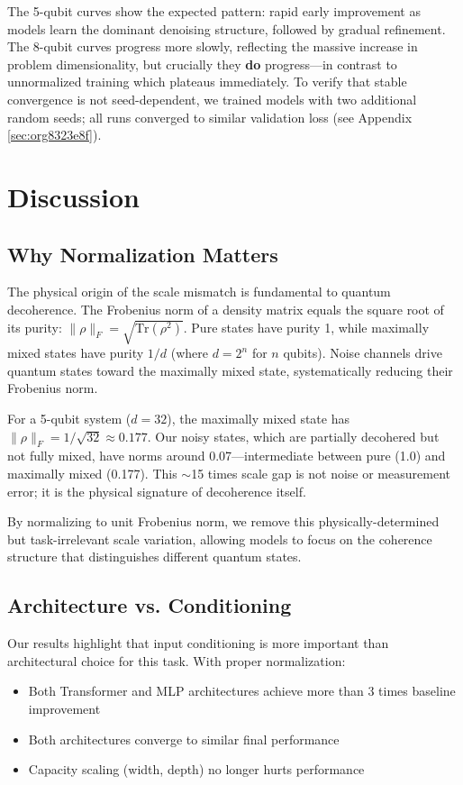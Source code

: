 \documentclass[11pt]{article}
\begin{document}
The 5-qubit curves show the expected pattern: rapid early improvement as models learn the dominant denoising structure, followed by gradual refinement. The 8-qubit curves progress more slowly, reflecting the massive increase in problem dimensionality, but crucially they \textbf{do} progress---in contrast to unnormalized training which plateaus immediately. To verify that stable convergence is not seed-dependent, we trained models with two additional random seeds; all runs converged to similar validation loss (see Appendix \ref{sec:org8323e8f}).
\section{Discussion}
\label{sec:org541cf87}

\subsection{Why Normalization Matters}
\label{sec:org42838f6}

The physical origin of the scale mismatch is fundamental to quantum decoherence. The Frobenius norm of a density matrix equals the square root of its purity: \(\|\rho\|_F = \sqrt{\mathrm{Tr}(\rho^2)}\). Pure states have purity 1, while maximally mixed states have purity \(1/d\) (where \(d = 2^n\) for \(n\) qubits). Noise channels drive quantum states toward the maximally mixed state, systematically reducing their Frobenius norm.

For a 5-qubit system (\(d = 32\)), the maximally mixed state has \(\|\rho\|_F = 1/\sqrt{32} \approx 0.177\). Our noisy states, which are partially decohered but not fully mixed, have norms around 0.07---intermediate between pure (1.0) and maximally mixed (0.177). This \(\sim\)15 times scale gap is not noise or measurement error; it is the physical signature of decoherence itself.

By normalizing to unit Frobenius norm, we remove this physically-determined but task-irrelevant scale variation, allowing models to focus on the coherence structure that distinguishes different quantum states.
\subsection{Architecture vs. Conditioning}
\label{sec:org7b4b9c2}

Our results highlight that input conditioning is more important than architectural choice for this task. With proper normalization:
\begin{itemize}
\item Both Transformer and MLP architectures achieve more than 3 times baseline improvement
\item Both architectures converge to similar final performance
\item Capacity scaling (width, depth) no longer hurts performance
\end{itemize}
\end{document}
